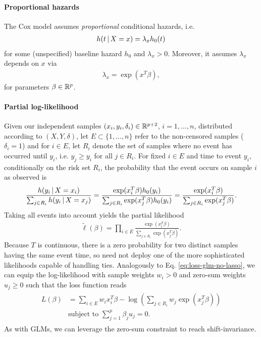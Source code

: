 \paragraph{Proportional hazards} The Cox model assumes \textit{proportional} conditional hazards, 
i.e. 
\begin{align}
    h(t \,|\, X = x) = \lambda_x h_0(t) 
\end{align}
for some (unspecified) baseline hazard $h_0$ and $\lambda_x > 0$. Moreover, it assumes $\lambda_x$ depends 
on $x$ via 
\begin{align}
    \lambda_x = \exp(x^T \beta),
\end{align}
for parameters $\beta \in \mathbb{R}^p$.

\paragraph{Partial log-likelihood}
Given our independent samples $(x_i, y_i, \delta_i) \in \mathbb{R}^{p+2}$, $i = 1, \ldots, n$, distributed 
according to $(X, Y, \delta)$, let $E \subset \{ 1, \ldots, n \}$ refer to the non-censored samples 
($\delta_i = 1$) and for $i \in E$, let $R_i$ denote the set of samples where no event has occurred 
until $y_i$, i.e. $y_j \geq y_i$ for all $j \in R_i$. For fixed $i \in E$ and time to event $y_i$,
conditionally on the risk set $R_i$, the probability that the event occurs on sample $i$ as 
observed is
\begin{align}
    \frac{h(y_i \,|\, X = x_i)}{\sum_{j \in R_i} h(y_i \,|\, X = x_j)} = 
    \frac{\exp(x_i^T \beta) h_0(y_i)}{\sum_{j \in R_i} \exp(x_j^T \beta) h_0(y_i)} = 
    \frac{\exp(x_i^T \beta)}{\sum_{j \in R_i} \exp(x_j^T \beta)}.
\end{align}
Taking all events into account yields the partial likelihood 
\begin{align}
    \tilde{\ell}(\beta) = \prod_{i \in E} \frac{\exp(x_i^T \beta)}{\sum_{j \in R_i} \exp(x_j^T 
    \beta)}.
\end{align}
Because $T$ is continuous, there is a zero probability for two distinct samples having the same 
event time, so need not deploy one of the more sophisticated likelihoods capable of handling ties.
Analogously to Eq. \eqref{eq:loss-glm-no-lasso}, we can equip the log-likelihood with sample 
weights $w_i > 0$ and zero-sum weights $u_j \geq 0$ such that the loss function reads 
\begin{align}
\begin{split}
    L(\beta) &= \sum_{i \in E} w_i x_i^T \beta - \log \left( \sum_{j \in R_i} w_j \exp(x_j^T
    \beta) \right) \\
    & \text{subject to } \sum_{j=1}^p \beta_j u_j = 0.
\end{split}
\end{align}
As with GLMs, we can leverage the zero-sum constraint to reach shift-invariance.

